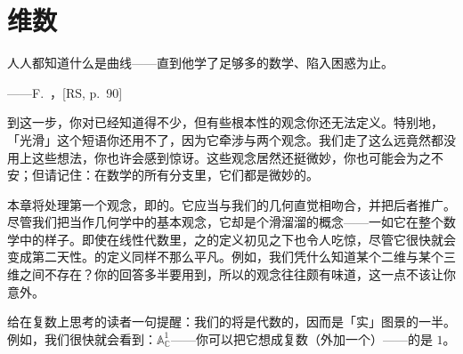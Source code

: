 
\chapter{维数}
\label{ch:dimension}

\epigraph{人人都知道什么是曲线——直到他学了足够多的数学、陷入困惑为止。}{——F.~\trKlein，[RS, p.~90]}

到这一步，你对\trScheme{}已经知道得不少，但有些根本性的观念你还无法定义。特别地，「光滑\trSurface」这个短语你还用不了，因为它牵涉\trDimension{}与\trSmoothness{}两个观念。我们走了这么远竟然都没用上这些想法，你也许会感到惊讶。这些观念居然还挺微妙，你也可能会为之不安；但请记住：在数学的所有分支里，它们都是微妙的。

本章将处理第一个观念，即\trScheme{}的\trDimension。它应当与我们的几何直觉相吻合，并把后者推广。尽管我们把\trDimension{}当作几何学中的基本观念，它却是个滑溜溜的概念——一如它在整个数学中的样子。即使在线性代数里，\trVectorSpace{}之\trDimension{}的定义初见之下也令人吃惊，尽管它很快就会变成第二天性。\trManifold{}的\trDimension{}定义同样不那么平凡。例如，我们凭什么知道某个二维\trManifold{}与某个三维\trManifold{}之间不存在\trIsomorphism？你的回答多半要用到\trTopology，所以\trDimension{}的观念往往颇有\trTopology{}味道，这一点不该让你意外。

给在复数上思考的读者一句提醒：我们的\trDimension{}将是代数的，因而是「实」图景的一半。例如，我们很快就会看到：$\mathbb{A}^1_{\mathbb{C}}$——你可以把它想成复数（外加一个\trGenericPoint）——的\trDimension{}是 $1$。





